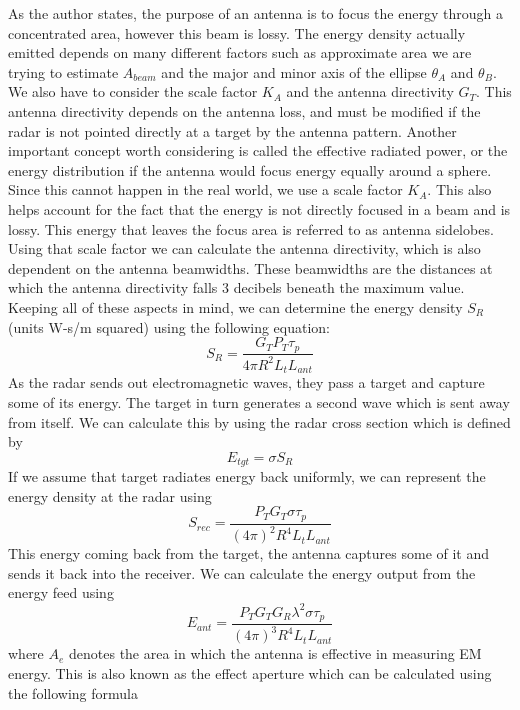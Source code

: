 \documentclass[12pt]{article}
\begin{document}
As the author states, the purpose of an antenna is to focus the energy through a concentrated area, however this beam is lossy. The energy density actually emitted depends on many different factors such as approximate area we are trying to estimate $A_{beam}$ and the major and minor axis of the ellipse $\theta_A$ and $\theta_B$. We also have to consider the scale factor $K_A$ and  the antenna directivity $G_T$. This antenna directivity depends on the antenna loss, and must be modified if the radar is not pointed directly at a target by the antenna pattern. 
Another important concept worth considering is called the effective radiated power, or the energy distribution if the antenna would focus energy equally around a sphere. Since this cannot happen in the real world, we use a scale factor $K_A$. This also helps account for the fact that the energy is not directly focused in a beam and is lossy. This energy that leaves the focus area is referred to as antenna sidelobes. Using that scale factor we can calculate the antenna directivity, which is also dependent on the antenna beamwidths. These beamwidths are the distances at which the antenna directivity falls 3 decibels beneath the maximum value. Keeping all of these aspects in mind, we can determine the energy density $S_R$ (units W-s/m squared) using the following equation:
\begin{equation}
    S_R = \frac{G_T P_T \tau_p}{4 \pi R^2 L_t L_{ant}}
\end{equation}
As the radar sends out electromagnetic waves, they pass a target and capture some of its energy. The target in turn generates a second wave which is sent away from itself. We can calculate this by using the radar cross section which is defined by
\begin{equation}
    E_{tgt} = \sigma S_R 
\end{equation}
If we assume that target radiates energy back uniformly, we can represent the energy density at the radar using 
\begin{equation}
    S_{rec} = \frac{P_T G_T \sigma \tau_p}{(4 \pi)^2 R^4 L_t L_{ant}}
\end{equation}
This energy coming back from the target, the antenna captures some of it and sends it back into the receiver. We can calculate the energy output from the energy feed using
\begin{equation}
    E_{ant} = \frac{P_T G_T G_R \lambda^2 \sigma \tau_p}{(4 \pi)^3 R^4 L_t L_{ant}}
\end{equation}
where $A_e$ denotes the area in which the antenna is effective in measuring EM energy. This is also known as the effect aperture which can be calculated using the following formula
\end{document}
